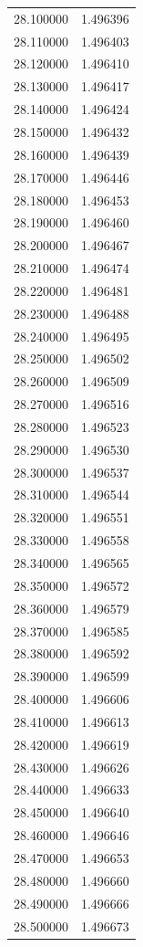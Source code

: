 \begin{tabular}{rr}
28.100000 & 1.496396 \\
28.110000 & 1.496403 \\
28.120000 & 1.496410 \\
28.130000 & 1.496417 \\
28.140000 & 1.496424 \\
28.150000 & 1.496432 \\
28.160000 & 1.496439 \\
28.170000 & 1.496446 \\
28.180000 & 1.496453 \\
28.190000 & 1.496460 \\
28.200000 & 1.496467 \\
28.210000 & 1.496474 \\
28.220000 & 1.496481 \\
28.230000 & 1.496488 \\
28.240000 & 1.496495 \\
28.250000 & 1.496502 \\
28.260000 & 1.496509 \\
28.270000 & 1.496516 \\
28.280000 & 1.496523 \\
28.290000 & 1.496530 \\
28.300000 & 1.496537 \\
28.310000 & 1.496544 \\
28.320000 & 1.496551 \\
28.330000 & 1.496558 \\
28.340000 & 1.496565 \\
28.350000 & 1.496572 \\
28.360000 & 1.496579 \\
28.370000 & 1.496585 \\
28.380000 & 1.496592 \\
28.390000 & 1.496599 \\
28.400000 & 1.496606 \\
28.410000 & 1.496613 \\
28.420000 & 1.496619 \\
28.430000 & 1.496626 \\
28.440000 & 1.496633 \\
28.450000 & 1.496640 \\
28.460000 & 1.496646 \\
28.470000 & 1.496653 \\
28.480000 & 1.496660 \\
28.490000 & 1.496666 \\
28.500000 & 1.496673 \\

\end{tabular}
